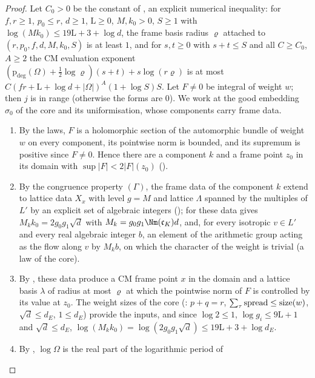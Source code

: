 \begin{proof}
Let $C_0>0$ be the constant of , an explicit numerical
inequality: for $f,r\ge1$, $p_0\le r$, $d\ge1$, $\mathrm L\ge0$, $M,k_0>0$, $S\ge1$ with $\log(Mk_0)\le19\mathrm L+3+\log d$, the
frame basis radius $\varrho$ attached to $(r,p_0,f,d,M,k_0,S)$ is at least $1$, and for $s,t\ge0$ with $s+t\le S$ and all
$C\ge C_0$, $A\ge2$ the CM evaluation exponent $(\mathrm{p}_{\deg}(\Omega)+\frac12\log\varrho)(s+t)+s\log(r\varrho)$ is at
most $C(fr+\mathrm L+\log d+|\Omega|)^A(1+\log S)S$. Let $F\ne0$ be integral of weight $w$; then $j$ is in range
(otherwise the forms are $0$). We work at the good embedding $\sigma_0$ of the core and its uniformisation, whose
components carry frame data.
\begin{enumerate}[label=(\arabic*)]
\item By the laws, $F$ is a holomorphic section of the automorphic bundle of weight $w$ on every component, its
pointwise norm is bounded, and its supremum is positive since $F\ne0$. Hence there are a component $k$ and a frame
point $z_0$ in its domain with $\sup|F|<2|F|(z_0)$ ().
\item By the congruence property $(\Gamma)$, the frame data of the component $k$ extend to lattice data $X_x$ with
level $g=M$ and lattice $\Lambda$ spanned by the multiples of $L'$ by an explicit set of algebraic integers
(); for these data
 gives $M_kk_0=2g_0g_1\sqrt d$ with $M_k=g_0g_1\Nm(\mathfrak c_K)d$, and,
for every isotropic $v\in L'$ and every real algebraic integer $b$, an element of the arithmetic group acting as the
flow along $v$ by $M_kb$, on which the character of the weight is trivial (a law of the core).
\item By , these data produce a CM frame point $x$ in the domain and
a lattice basis $\lambda$ of radius at most $\varrho$ at which the pointwise norm of $F$ is controlled by its value at
$z_0$. The weight sizes of the core (: $p+q=r$, $\sum_\tau\mathrm{spread}\le
\operatorname{size}(w)$, $\sqrt d\le d_E$, $1\le d_E$) provide the inputs, and since $\log2\le1$, $\log g_i\le9\mathrm L+1$
and $\sqrt d\le d_E$, $\log(M_kk_0)=\log(2g_0g_1\sqrt d)\le19\mathrm L+3+\log d_E$.
\item By , $\log\Omega$ is the real part of the logarithmic period of

\end{enumerate}
\end{proof}
